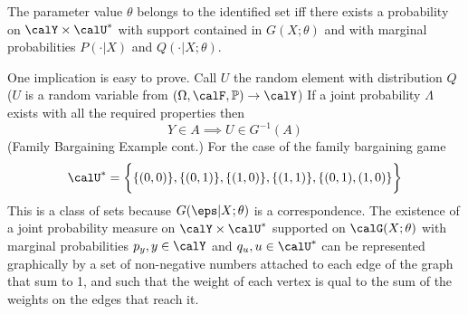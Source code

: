 \begin{theorem}
	\label{thm:GH-3}
	The parameter value $\theta$ belongs to the identified set iff there exists a probability on $\calY \times \calU^*$ with support contained in $G(X;\theta)$ and with marginal probabilities $P(\cdot|X)$ and $Q(\cdot|X;\theta)$. 
\end{theorem}

One implication is easy to prove. Call $U$ the random element with distribution $Q$ ($U$ is a random variable from $(\Omega, \calF, \mathbb{P}) \rightarrow \calY$) If a joint probability $\Lambda$ exists with all the required properties then 
\[Y\in A \implies U\in G^{-1}(A)\]
(Family Bargaining Example cont.) For the case of the family bargaining game 
\[\calU^* = \bigg\{\{(0,0)\}, \{(0,1)\}, \{(1,0)\}, \{(1,1)\}, \{(0,1),(1,0)\}\bigg\}\] 
This is a class of sets because $G(\eps|X;\theta)$ is a correspondence. The existence of a joint probability measure on $\calY \times \calU^*$ supported on $\calG(X;\theta)$ with marginal probabilities $p_y, y\in\calY$ and $q_u, u\in\calU^*$ can be represented graphically by a set of non-negative numbers attached to each edge of the graph that sum to 1, and such that the weight of each vertex is qual to the sum of the weights on the edges that reach it.

